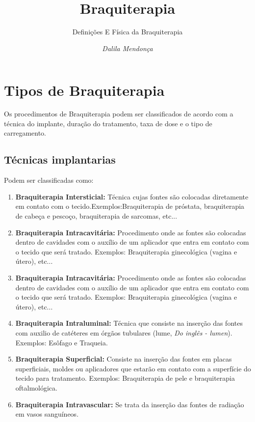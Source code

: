\documentclass[11pt,a4paper]{article}
\title{Braquiterapia}
\author{Definições E Física da Braquiterapia\nocite{*}}
\date{\textit{Dalila Mendonça}}
\begin{document}
	\maketitle



	\section{Tipos de Braquiterapia}

	Os procedimentos de Braquiterapia podem ser classificados de acordo com a técnica do implante, duração do tratamento, taxa de dose e o tipo de carregamento.

		\subsection{Técnicas implantarias}

		Podem ser classificadas como:

		\begin{enumerate}
			\item \textbf{Braquiterapia Intersticial:} Técnica cujas fontes são colocadas diretamente em contato com o tecido.Exemplos:Braquiterapia de próstata, braquiterapia de cabeça e pescoço, braquiterapia de sarcomas, etc...
			
			\item \textbf{Braquiterapia Intracavitária:}  Procedimento onde as fontes são colocadas dentro de cavidades com o auxílio de um aplicador que entra em contato com o tecido que será tratado. Exemplos: Braquiterapia ginecológica (vagina e útero), etc...
			
			\item \textbf{Braquiterapia Intracavitária:}  Procedimento onde as fontes são colocadas dentro de cavidades com o auxílio de um aplicador que entra em contato com o tecido que será tratado. Exemplos: Braquiterapia ginecológica (vagina e útero), etc...
			
			\item \textbf{Braquiterapia Intraluminal:} Técnica que consiste na inserção das fontes com auxilio de catéteres em órgãos tubulares (lume, \textit{Do inglês - lumen}). Exemplos: Esôfago e Traqueia.
			
			\item \textbf{Braquiterapia Superficial:} Consiste na inserção das fontes em placas superficiais, moldes ou aplicadores que estarão em contato com a superfície do tecido para tratamento. Exemplos: Braquiterapia de pele e braquiterapia oftalmológica.
			
			\item \textbf{Braquiterapia Intravascular:} Se trata da inserção das fontes de radiação em vasos sanguíneos.

		\end{enumerate}
\end{document}
